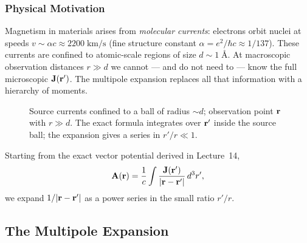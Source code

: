\subsubsection*{Physical Motivation}

Magnetism in materials arises from \emph{molecular currents}: electrons orbit nuclei
at speeds $v \sim \alpha c \approx 2200\;\text{km/s}$ (fine structure constant
$\alpha = e^2/\hbar c \approx 1/137$).  These currents are confined to atomic-scale
regions of size $d \sim 1\;\text{\AA}$.  At macroscopic observation distances
$r \gg d$ we cannot — and do not need to — know the full microscopic $\mathbf{J}(\mathbf{r}')$.
The multipole expansion replaces all that information with a hierarchy of moments.

\begin{figure}[h]
\centering
{}
\caption{Source currents confined to a ball of radius $\sim d$; observation point
$\mathbf{r}$ with $r \gg d$.  The exact formula integrates over $\mathbf{r}'$ inside the source
ball; the expansion gives a series in $r'/r \ll 1$.}
\label{fig:lec15-geometry}
\end{figure}

Starting from the exact vector potential derived in Lecture~14,
\begin{equation}\label{eq:lec15-exact-A}
  \mathbf{A}(\mathbf{r}) = \frac{1}{c}\int \frac{\mathbf{J}(\mathbf{r}')}{|\mathbf{r}-\mathbf{r}'|}\,d^3r',
\end{equation}
we expand $1/|\mathbf{r}-\mathbf{r}'|$ as a power series in the small ratio $r'/r$.

\subsection{The Multipole Expansion}\label{subsec:lec15-expansion}

